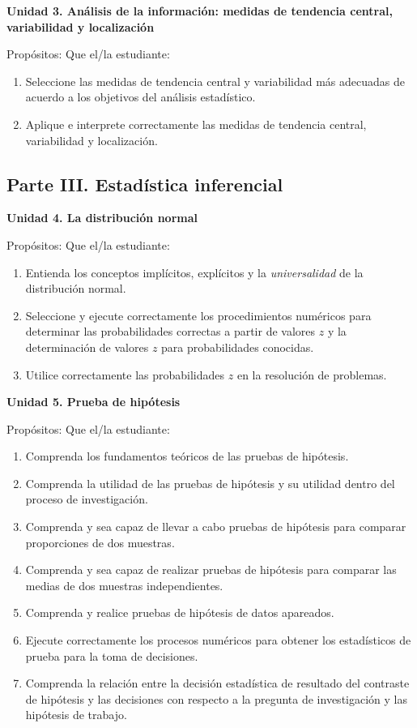 \textbf{Unidad 3. An\'alisis de la informaci\'on: medidas de tendencia central, variabilidad y localizaci\'on}

Prop\'ositos: Que el/la estudiante:
\begin{enumerate}
    \item Seleccione las medidas de tendencia central y variabilidad m\'as adecuadas de acuerdo a los objetivos del an\'alisis estad\'istico.
    \item Aplique e interprete correctamente las medidas de tendencia central, variabilidad y localizaci\'on.
\end{enumerate}

\subsection{Parte III. Estad\'istica inferencial}

\textbf{Unidad 4. La distribuci\'on normal}

Prop\'ositos: Que el/la estudiante:
\begin{enumerate}
    \item Entienda los conceptos impl\'icitos, expl\'icitos y la \textit{universalidad} de la distribuci\'on normal.
    \item Seleccione y ejecute correctamente los procedimientos num\'ericos para determinar las probabilidades correctas a partir de valores $z$ y la determinaci\'on de valores $z$ para probabilidades conocidas.
    \item Utilice correctamente las probabilidades $z$ en la resoluci\'on de problemas.
\end{enumerate}

\textbf{Unidad 5. Prueba de hip\'otesis}

Prop\'ositos: Que el/la estudiante:
\begin{enumerate}
    \item Comprenda los fundamentos te\'oricos de las pruebas de hip\'otesis.
    \item Comprenda la utilidad de las pruebas de hip\'otesis y su utilidad dentro del proceso de investigaci\'on.
    \item Comprenda y sea capaz de llevar a cabo pruebas de hip\'otesis para comparar proporciones de dos muestras.
    \item Comprenda y sea capaz de realizar pruebas de hip\'otesis para comparar las medias de dos muestras independientes.
    \item Comprenda y realice pruebas de hip\'otesis de datos apareados.
    \item Ejecute correctamente los procesos num\'ericos para obtener los estad\'isticos de prueba para la toma de decisiones.
    \item Comprenda la relaci\'on entre la decisi\'on estad\'istica de resultado del contraste de hip\'otesis y las decisiones con respecto a la pregunta de investigaci\'on y las hip\'otesis de trabajo.
\end{enumerate}

